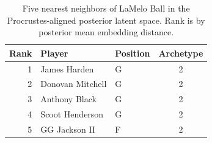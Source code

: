 \begin{table}[htbp]
  \centering\small
  \begin{tabular}{rllc}
    \toprule
    Rank & Player & Position & Archetype \\
    \midrule
    1 & James Harden & G & 2 \\
    2 & Donovan Mitchell & G & 2 \\
    3 & Anthony Black & G & 2 \\
    4 & Scoot Henderson & G & 2 \\
    5 & GG Jackson II & F & 2 \\
    \bottomrule
  \end{tabular}
  \caption{Five nearest neighbors of LaMelo Ball in the Procrustes-aligned posterior latent space. Rank is by posterior mean embedding distance.}
  \label{tab:LaMelo_Ball_neighbors}
\end{table}

